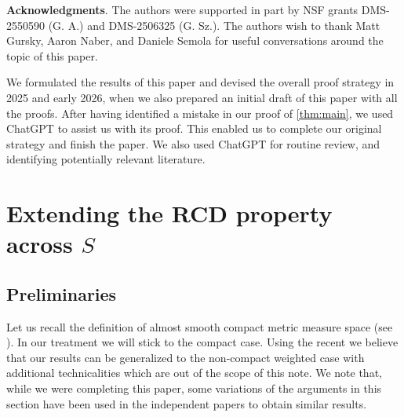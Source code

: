 \documentclass[12pt,a4paper,reqno]{amsart}
\begin{document}
\textbf{Acknowledgments}. The authors were supported in part by NSF grants DMS-2550590 (G. A.) and DMS-2506325 (G. Sz.). The authors wish to thank Matt Gursky, Aaron Naber, and Daniele Semola for useful conversations around the topic of this paper. 
\smallskip 

We formulated the results of this paper and devised the overall proof strategy in 2025 and early 2026, when we also prepared an initial draft of this paper with all the proofs. After having identified a mistake in our proof of \cref{thm:main}, we used ChatGPT to assist us with its proof. This enabled us to complete our original strategy and finish the paper. We also used ChatGPT for routine review, and identifying potentially relevant literature. 

\section{Extending the RCD property across \texorpdfstring{$S$}{S}}

\subsection{Preliminaries}

Let us recall the definition of almost smooth compact metric measure space (see \cite{Honda, Gabor}). In our treatment we will stick to the compact case. Using the recent \cite[Corollary 5.4]{HondaSun} we believe that our results can be generalized to the non-compact weighted case with additional technicalities which are out of the scope of this note. We note that, while we were completing this paper, some variations of the arguments in this section have been used in the independent papers \cite{WWX26, KWW26, BZ26} to obtain similar results.
\end{document}
